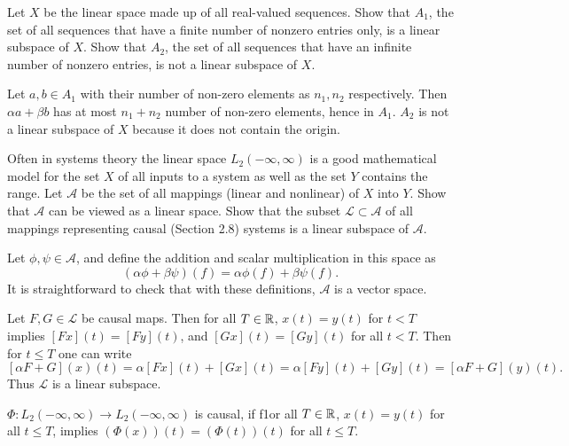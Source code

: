 \begin{problem}
	Let $ X $ be the linear space made up of all real-valued sequences. Show that $ A_1 $, the set of all sequences that have a finite number of nonzero entries only, is a linear subspace of $ X $. Show that $ A_2 $, the set of all sequences that have an infinite number of nonzero entries, is not a linear subspace of $ X $.
\end{problem}

\begin{solution}
	Let $ a,b\in A_1 $ with their number of non-zero elements as $ n_1,n_2 $ respectively. Then $ \alpha a+ \beta b $ has at most $ n_1+n_2 $ number of non-zero elements, hence in $ A_1 $. $ A_2 $ is not a linear subspace of $ X $ because it does not contain the origin.
\end{solution}



\begin{problem}
	Often in systems theory the linear space $ L_2(-\infty,\infty) $ is a good mathematical model for the set $ X $ of all inputs to a system as well as the set $ Y $ contains the range. Let $ \mathcal{A} $ be the set of all mappings (linear and nonlinear) of $ X $ into $ Y $. Show that $ \mathcal{A} $ can be viewed as a linear space. Show that the subset $ \mathcal{L} \subset \mathcal{A} $ of all mappings representing causal (Section 2.8) systems is a linear subspace of $ \mathcal{A} $.
\end{problem}

\begin{solution}
	Let $ \phi,\psi \in \mathcal{A} $, and define the addition and scalar multiplication in this space as
	\[ (\alpha\phi + \beta \psi)(f) = \alpha \phi(f) + \beta\psi(f). \]
	It is straightforward to check that with these definitions, $ \mathcal{A} $ is a vector space.
	
	Let $ F, G \in \mathcal{L} $ be causal maps. Then for all $ T\in\mathbb{R} $, $ x(t) = y(t) $ for $ t <T $ implies $ [Fx](t) = [Fy](t) $, and $ [Gx](t) = [Gy](t) $ for all $ t<T $. Then for $ t\leq T $ one can write
	\[ [\alpha F + G](x)(t) = \alpha [Fx](t) + [Gx](t) = \alpha[Fy](t) + [Gy](t) = [\alpha F+G](y)(t). \]
	Thus $ \mathcal{L} $ is a linear subspace.
\end{solution}

\begin{remark}
	$ \Phi: L_2(-\infty,\infty) \to L_2(-\infty,\infty) $ is causal, if f1or all $ T\in \mathbb{R} $, $ x(t) = y(t) $ for all $ t\leq T $, implies $ (\Phi(x))(t) = (\Phi(t))(t) $ for all $ t\leq T $.
\end{remark}


